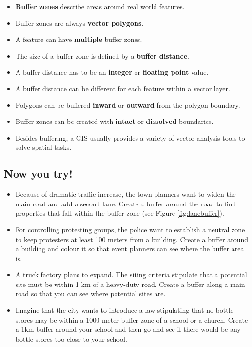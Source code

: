\begin{itemize}
\item \textbf{Buffer zones} describe areas around real world features.
\item Buffer zones are always \textbf{vector polygons}.
\item A feature can have \textbf{multiple} buffer zones.
\item The size of a buffer zone is defined by a \textbf{buffer distance}.
\item A buffer distance has to be an \textbf{integer} or \textbf{floating
point} value.
\item A buffer distance can be different for each feature within a vector layer.
\item Polygons can be buffered \textbf{inward} or \textbf{outward} from the
polygon boundary.
\item Buffer zones can be created with \textbf{intact} or \textbf{dissolved}
boundaries.
\item Besides buffering, a GIS usually provides a variety of vector analysis tools
to solve spatial tasks. 
\end{itemize}

\subsection{Now you try!}

\begin{itemize}
\item Because of dramatic traffic increase, the town planners want to widen the
main road and add a second lane. Create a buffer around the road to find
properties that fall within the buffer zone (see Figure \ref{fig:lanebuffer}). 
\item For controlling protesting groups, the police want to establish a neutral
zone to keep protesters at least 100 meters from a building. Create a buffer
around a building and colour it so that event planners can see where the
buffer area is.
\item A truck factory plans to expand. The siting criteria stipulate that a
potential site must be within 1 km of a heavy-duty road. Create a buffer
along a main road so that you can see where potential sites are.
\item Imagine that the city wants to introduce a law stipulating that no bottle
stores may be within a 1000 meter buffer zone of a school or a church. Create
a 1km buffer around your school and then go and see if there would be any
bottle stores too close to your school.
\end{itemize}

